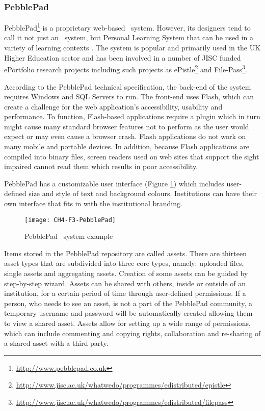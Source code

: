 \subsubsection{PebblePad}

PebblePad\footnote{\url{http://www.pebblepad.co.uk}} is a proprietary web-based
\ep~system. However, its designers tend to call it not just an \ep~system, but
Personal Learning System that can be used in a variety of learning contexts
\citep{PebbleLearningLtd2010}. The system is popular and primarily used in the
UK Higher Education sector and has been involved in a number of JISC funded
ePortfolio research projects including such projects as 
ePistle\footnote{\url{http://www.jisc.ac.uk/whatwedo/programmes/edistributed/epistle}}
and File-Pass\footnote{\url{http://www.jisc.ac.uk/whatwedo/programmes/edistributed/filepass}}.

According to the PebblePad technical specification, the back-end of the system
requires Windows and SQL Servers to run. The front-end uses Flash, which can
create a challenge for the web application's accessibility, usability and
performance. To function, Flash-based applications require a plugin which in
turn might cause many standard browser features not to perform as the user would
expect or may even cause a browser crash. Flash applications do not work on many
mobile and portable devices. In addition, because Flash applications are
compiled into binary files, screen readers used on web sites that support the
sight impaired cannot read them which results in poor accessibility.

PebblePad has a customizable user interface (Figure \ref{fig:ppep}) which
includes user-defined size and style of text and background colours.
Institutions can have their own interface that fits in with the institutional
branding.

\begin{figure}[htb]
\centering
\texttt{[image: CH4-F3-PebblePad]}
\caption[PebblePad \ep~system example]{PebblePad \ep~system example
\citep{PebbleLearningLtd}}
\label{fig:ppep}
\end{figure}

Items stored in the PebblePad repository are called assets. There are thirteen
asset types that are subdivided into three core types, namely: uploaded files,
single assets and aggregating assets. Creation of some assets can be guided by
step-by-step wizard. Assets can be shared with others, inside or outside of an
institution, for a certain period of time through user-defined permissions. If a
person, who needs to see an asset, is not a part of the PebblePad community, a
temporary username and password will be automatically created allowing them to
view a shared asset. Assets allow for setting up a wide range of permissions,
which can include commenting and copying rights, collaboration and re-sharing
of a shared asset with a third party.


